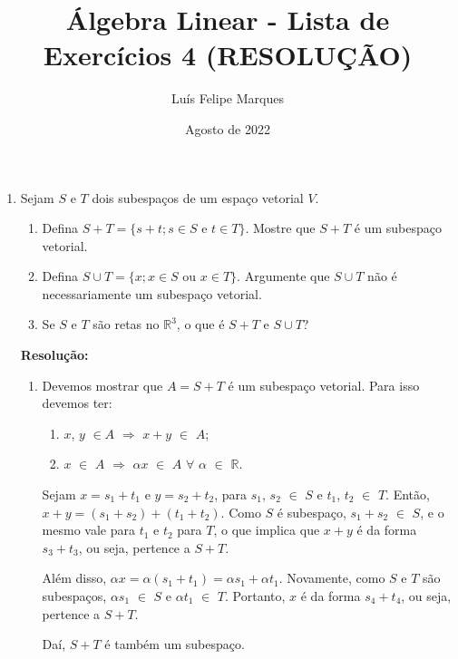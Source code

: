 \documentclass[leqno]{article}
\title{Álgebra Linear - Lista de Exercícios 4 (RESOLUÇÃO)}
\author{Luís Felipe Marques}
\date{Agosto de 2022}
\begin{document}
 
\maketitle

\begin{enumerate}
    \item Sejam $S$ e $T$ dois subespaços de um espaço vetorial $V$.
    
    \begin{enumerate}
        \item Defina $S+T=\{s+t;s\in S\text{ e }t\in T\}$. Mostre que $S+T$ é um subespaço vetorial.
        
        \item Defina $S\cup T=\{x;x\in S\text{ ou } x\in T\}$. Argumente que $S\cup T$ não é necessariamente um subespaço vetorial.
        
        \item Se $S$ e $T$ são retas no $\mathbb{R}^3$, o que é $S+T$ e $S\cup T$?
    \end{enumerate}
    
    \textbf{Resolução:}

    \begin{enumerate}
        \item Devemos mostrar que $A=S+T$ é um subespaço vetorial. Para isso devemos ter:
        
        \begin{enumerate}
            \item $x$, $y$ $\in A$ $\Rightarrow$ $x+y$ $\in$ $A$;
            \item $x$ $\in$ $A$ $\Rightarrow$ $\alpha x$ $\in$ $A$ $\forall$ $\alpha$ $\in$ $\mathbb{R}$.
        \end{enumerate}
        
        Sejam $x=s_1+t_1$ e $y=s_2+t_2$, para $s_1$, $s_2$ $\in$ $S$ e $t_1$, $t_2$ $\in$ $T$. Então, $x+y=(s_1+s_2)+(t_1+t_2)$. Como $S$ é subespaço, $s_1+s_2$ $\in$ $S$, e o mesmo vale para $t_1$ e $t_2$ para $T$, o que implica que $x+y$ é da forma $s_3+t_3$, ou seja, pertence a $S+T$.
        
        Além disso, $\alpha x=\alpha(s_1+t_1)=\alpha s_1 + \alpha t_1$. Novamente, como $S$ e $T$ são subespaços, $\alpha s_1$ $\in$ $S$ e $\alpha t_1$ $\in$ $T$. Portanto, $x$ é da forma $s_4+t_4$, ou seja, pertence a $S+T$.
        
        Daí, $S+T$ é também um subespaço.
        

\end{enumerate}
\end{enumerate}
\end{document}
